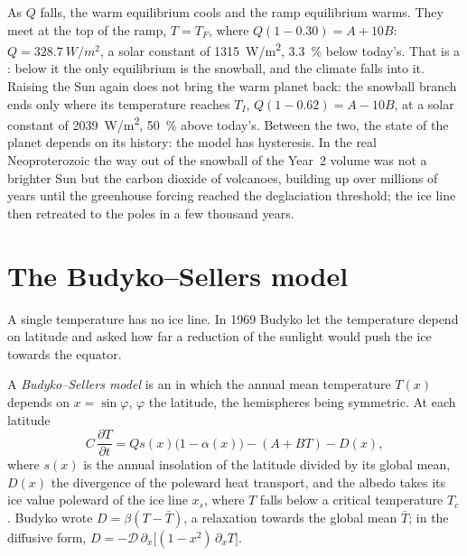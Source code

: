 
As $Q$ falls, the warm equilibrium cools and the ramp equilibrium warms.
They meet at the top of the ramp, $T = T_F$, where $Q(1 - 0.30) = A +
10B$: $Q = \qty{328.7}{W/m^2}$, a solar constant of \qty{1315}{W/m^2},
\qty{3.3}{\percent} below today's. That is a : below
it the only equilibrium is the snowball, and the climate falls into it.
Raising the Sun again does not bring the warm planet back: the snowball
branch ends only where its temperature reaches $T_I$, $Q(1 - 0.62) = A -
10B$, at a solar constant of \qty{2039}{W/m^2}, \qty{50}{\percent} above
today's. Between the two, the state of the planet depends on its history:
the model has hysteresis. In the real Neoproterozoic the way out of the
snowball of the Year~2 volume was not a brighter Sun but the carbon dioxide
of volcanoes, building up over millions of years until the greenhouse
forcing reached the deglaciation threshold; the ice line then retreated to
the poles in a few thousand years.

\section{The Budyko--Sellers model}\label{sec:b3:climate-models:budyko-sellers}

A single temperature has no ice line. In 1969 Budyko let the temperature
depend on latitude and asked how far a reduction of the sunlight would push
the ice towards the equator.

\begin{definition}\label{def:b3:climate-models:budyko-sellers}
A \emph{Budyko--Sellers model} is an
 in which the annual mean temperature $T(x)$ depends on
$x = \sin\varphi$, $\varphi$ the latitude, the hemispheres being symmetric.
At each latitude
\[
C\,\frac{\partial T}{\partial t} = Qs(x)\big(1 - \alpha(x)\big) - (A + BT) - D(x) ,
\]
where $s(x)$ is the annual insolation of the latitude divided by its global
mean, $D(x)$ the divergence of the poleward heat transport, and the albedo
takes its ice value poleward of the ice line $x_s$, where $T$ falls below a
critical temperature $T_c$. Budyko wrote $D = \beta(T - \bar T)$, a
relaxation towards the global mean $\bar T$; in the diffusive form, $D =
-\mathcal D\,\partial_x\big[(1 - x^2)\,\partial_xT\big]$.
\end{definition}


